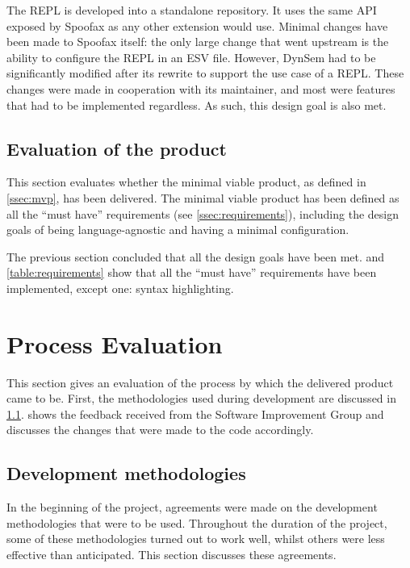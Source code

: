 The REPL is developed into a standalone repository. It uses the same API exposed
by Spoofax as any other extension would use. Minimal changes have been made to
Spoofax itself: the only large change that went upstream is the ability to
configure the REPL in an ESV file. However, DynSem had to be significantly
modified after its rewrite to support the use case of a REPL. These changes were
made in cooperation with its maintainer, and most were features that had to be
implemented regardless. As such, this design goal is also met.

\subsection{Evaluation of the product}
\label{ssec:eval-product}

This section evaluates whether the minimal viable product, as defined in
\cref{ssec:mvp}, has been delivered. The minimal viable product has been defined
as all the ``must have'' requirements (see \cref{ssec:requirements}), including
the design goals of being language-agnostic and having a minimal configuration.

The previous section concluded that all the design goals have been met.
 and \cref{table:requirements} show that all the
``must have'' requirements have been implemented, except one: syntax
highlighting.


\section{Process Evaluation}
\label{sec:process-evaluation}

This section gives an evaluation of the process by which the delivered product
came to be. First, the methodologies used during development are discussed in
\cref{ssec:dev-meth}.  shows the feedback received from the
Software Improvement Group and discusses the changes that were made to the code
accordingly.

\subsection{Development methodologies}
\label{ssec:dev-meth}

In the beginning of the project, agreements were made on the development
methodologies that were to be used. Throughout the duration of the project, some
of these methodologies turned out to work well, whilst others were less
effective than anticipated. This section discusses these agreements.

